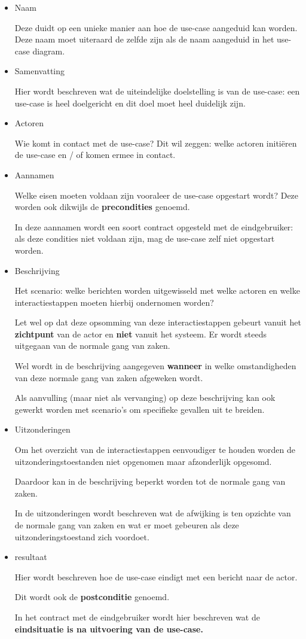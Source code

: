 \begin{itemize}
    \item Naam
    
    Deze duidt op een unieke manier aan hoe de use-case aangeduid kan worden. Deze naam moet uiteraard de zelfde zijn als de naam aangeduid in het use- case diagram.
    \item Samenvatting
    
    Hier wordt beschreven wat de uiteindelijke doelstelling is van de use-case: een use-case is heel doelgericht en dit doel moet heel duidelijk zijn.
    \item Actoren
    
    Wie komt in contact met de use-case? Dit wil zeggen: welke actoren initiëren de use-case en / of komen ermee in contact.
    \item Aannamen
    
    Welke eisen moeten voldaan zijn vooraleer de use-case opgestart wordt? Deze worden ook dikwijls de \textbf{precondities} genoemd.
    
In deze aannamen wordt een soort contract opgesteld met de eindgebruiker: als deze condities niet voldaan zijn, mag de use-case zelf niet opgestart worden.
    \item Beschrijving
    
    Het scenario: welke berichten worden uitgewisseld met welke actoren en welke interactiestappen moeten hierbij ondernomen worden?
    
    Let wel op dat deze opsomming van deze interactiestappen gebeurt vanuit het \textbf{zichtpunt} van de actor en \textbf{niet} vanuit het systeem. Er wordt steeds uitgegaan van de normale gang van zaken.
    
    Wel wordt in de beschrijving aangegeven \textbf{wanneer} in welke omstandigheden van deze normale gang van zaken afgeweken wordt.
    
    Als aanvulling (maar niet als vervanging) op deze beschrijving kan ook gewerkt worden met scenario's om specifieke gevallen uit te breiden.
    \item Uitzonderingen
    
    Om het overzicht van de interactiestappen eenvoudiger te houden worden de uitzonderingstoestanden niet opgenomen maar afzonderlijk opgesomd.
    
    Daardoor kan in de beschrijving beperkt worden tot de normale gang van zaken. 
    
    In de uitzonderingen wordt beschreven wat de afwijking is ten opzichte van de normale gang van zaken en wat er moet gebeuren als deze uitzonderingstoestand zich voordoet.
    
    \item resultaat
    
    Hier wordt beschreven hoe de use-case eindigt met een bericht naar de actor. 
    
    Dit wordt ook de \textbf{postconditie} genoemd.
    
    In het contract met de eindgebruiker wordt hier beschreven wat de \textbf{eindsituatie is na uitvoering van de use-case.}
\end{itemize}
\newpage
